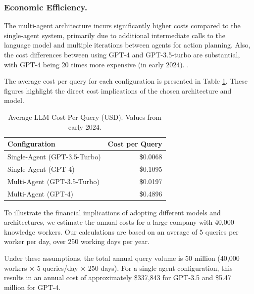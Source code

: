             
            \subsubsection{Economic Efficiency.} 
            
                The multi-agent architecture incurs significantly higher costs compared to the single-agent system, primarily due to additional intermediate calls to the language model and multiple iterations between agents for action planning. 
                Also, the cost differences between using GPT-4 and GPT-3.5-turbo are substantial, with GPT-4 being 20 times more expensive (in early 2024).
                .

                The average cost per query for each configuration is presented in Table \ref{tab:cost_per_query}. These figures highlight the direct cost implications of the chosen architecture and model.
                
                \begin{table}[h!]
                \centering
                \caption{Average LLM Cost Per Query (USD). Values from early 2024.}
                \label{tab:cost_per_query}
                \begin{tabular}{l r}
                \toprule
                \textbf{Configuration} & \textbf{Cost per Query} \\
                \midrule
                Single-Agent (GPT-3.5-Turbo) & \$0.0068 \\
                Single-Agent (GPT-4) & \$0.1095 \\
                Multi-Agent (GPT-3.5-Turbo) & \$0.0197 \\
                Multi-Agent (GPT-4) & \$0.4896 \\
                \bottomrule
                \end{tabular}
                \end{table}

                To illustrate the financial implications of adopting different models and architectures, we estimate the annual costs for a large company with 40,000 knowledge workers. Our calculations are based on an average of 5 queries per worker per day, over 250 working days per year.
                
                Under these assumptions, the total annual query volume is 50 million (40,000 workers $\times$ 5 queries/day $\times$ 250 days). For a single-agent configuration, this results in an annual cost of approximately \$337,843 for GPT-3.5 and \$5.47 million for GPT-4.
                
